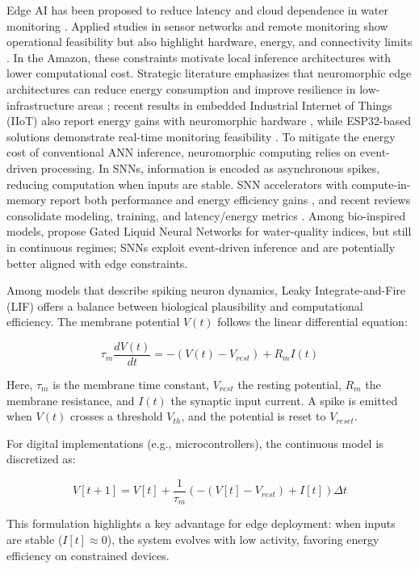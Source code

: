 Edge AI has been proposed to reduce latency and cloud dependence in water monitoring
\cite{rahu2023,lowe2022}. Applied studies in sensor networks and remote monitoring show operational
feasibility but also highlight hardware, energy, and connectivity limits \cite{rosero2020,alprol2024}.
In the Amazon, these constraints motivate local inference architectures with lower computational cost.
Strategic literature emphasizes that neuromorphic edge architectures can reduce energy consumption
and improve resilience in low-infrastructure areas \cite{aral2024}; recent results in embedded
Industrial Internet of Things (IIoT) also report energy gains with neuromorphic hardware
\cite{azadi2025}, while ESP32-based solutions demonstrate real-time monitoring feasibility
\cite{alshareeda2025}. To mitigate the energy cost of conventional ANN inference, neuromorphic
computing relies on event-driven processing. In SNNs, information is encoded as asynchronous spikes,
reducing computation when inputs are stable. SNN accelerators with compute-in-memory report both
performance and energy efficiency gains \cite{huijbregts2024}, and recent reviews consolidate
modeling, training, and latency/energy metrics \cite{aribe2025future}. Among bio-inspired models,
 propose Gated Liquid Neural Networks for water-quality indices, but still
in continuous regimes; SNNs exploit event-driven inference and are potentially better aligned with
edge constraints.

Among models that describe spiking neuron dynamics, Leaky Integrate-and-Fire (LIF) offers a balance
between biological plausibility and computational efficiency. The membrane potential $V(t)$ follows
the linear differential equation:

$$\tau_m \frac{dV(t)}{dt} = -(V(t) - V_{rest}) + R_m I(t)$$

Here, $\tau_m$ is the membrane time constant, $V_{rest}$ the resting potential, $R_m$ the membrane
resistance, and $I(t)$ the synaptic input current. A spike is emitted when $V(t)$ crosses a threshold
$V_{th}$, and the potential is reset to $V_{reset}$.

For digital implementations (e.g., microcontrollers), the continuous model is discretized as:

$$V[t+1] = V[t] + \frac{1}{\tau_m} (-(V[t] - V_{rest}) + I[t]) \Delta t$$

This formulation highlights a key advantage for edge deployment: when inputs are stable
($I[t] \approx 0$), the system evolves with low activity, favoring energy efficiency on constrained
devices.

